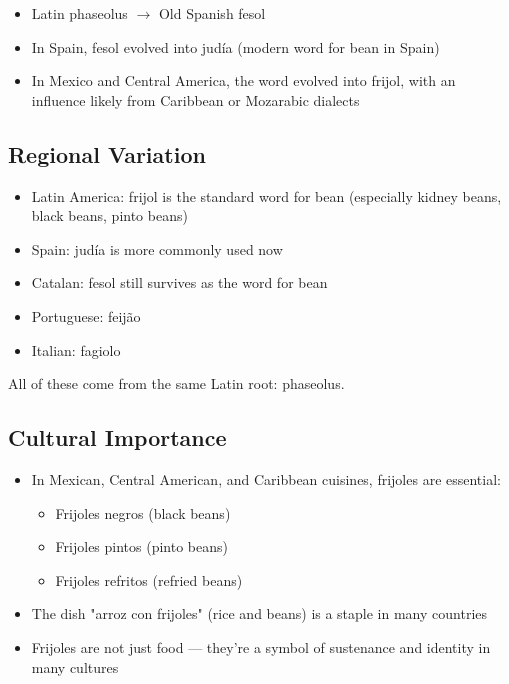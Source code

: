 \documentclass[10pt]{book}
\begin{document}
	\begin{itemize}
		\item Latin phaseolus $\rightarrow$ Old Spanish fesol
		\item In Spain, fesol evolved into judía (modern word for bean in Spain)
		\item In Mexico and Central America, the word evolved into frijol, with an influence likely from Caribbean or Mozarabic dialects
	\end{itemize}
	
	\subsection{Regional Variation}
	
	\begin{itemize}
		\item Latin America: frijol is the standard word for bean (especially kidney beans, black beans, pinto beans)
		\item Spain: judía is more commonly used now
		\item Catalan: fesol still survives as the word for bean
		\item Portuguese: feijão
		\item Italian: fagiolo
	\end{itemize}

	All of these come from the same Latin root: phaseolus.
	
	
	\subsection{Cultural Importance}
	
	\begin{itemize}
		\item In Mexican, Central American, and Caribbean cuisines, frijoles are essential:
		\begin{itemize}
			\item Frijoles negros (black beans)
			\item Frijoles pintos (pinto beans)
			\item Frijoles refritos (refried beans)
		\end{itemize}
		\item The dish "arroz con frijoles" (rice and beans) is a staple in many countries	
		\item Frijoles are not just food — they're a symbol of sustenance and identity in many cultures
	\end{itemize}
\end{document}
